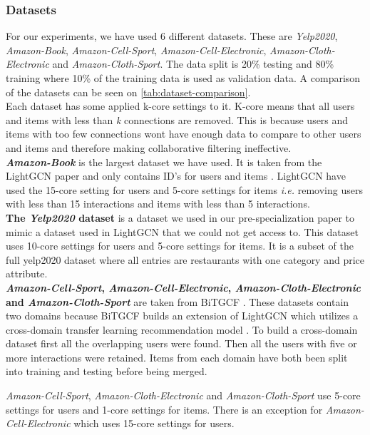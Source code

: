 \subsubsection{Datasets}

For our experiments, we have used 6 different datasets.
These are \textit{Yelp2020}, \textit{Amazon-Book}, \textit{Amazon-Cell-Sport}, \textit{Amazon-Cell-Electronic}, \textit{Amazon-Cloth-Electronic} and \textit{Amazon-Cloth-Sport}.
The data split is 20\% testing and 80\% training where 10\% of the training data is used as validation data.
A comparison of the datasets can be seen on \autoref{tab:dataset-comparison}.
\\
Each dataset has some applied k-core settings to it.
K-core means that all users and items with less than \textit{k} connections are removed.
This is because users and items with too few connections wont have enough data to compare to other users and items and therefore making collaborative filtering ineffective.
\\
\textbf{\textit{Amazon-Book}} is the largest dataset we have used.
It is taken from the LightGCN paper and only contains ID's for users and items \cite{lightgcn}.
LightGCN have used the 15-core setting for users and 5-core settings for items \textit{i.e.} removing users with less than 15 interactions and items with less than 5 interactions.
\\
\textbf{The \textit{Yelp2020} dataset} is a dataset we used in our pre-specialization paper to mimic a dataset used in LightGCN that we could not get access to.
This dataset uses 10-core settings for users and 5-core settings for items.
It is a subset of the full yelp2020 dataset where all entries are restaurants with one category and price attribute.
\\
\textbf{\textit{Amazon-Cell-Sport}, \textit{Amazon-Cell-Electronic}, \textit{Amazon-Cloth-Electronic} and \textit{Amazon-Cloth-Sport}} are taken from BiTGCF \cite{BiTGCF}.
These datasets contain two domains because BiTGCF builds an extension of LightGCN which utilizes a cross-domain transfer learning recommendation model \cite{BiTGCF}.
To build a cross-domain dataset first all the overlapping users were found.
Then all the users with five or more interactions were retained.
Items from each domain have both been split into training and testing before being merged.

\textit{Amazon-Cell-Sport}, \textit{Amazon-Cloth-Electronic} and \textit{Amazon-Cloth-Sport} use 5-core settings for users and 1-core settings for items.
There is an exception for \textit{Amazon-Cell-Electronic} which uses 15-core settings for users.


